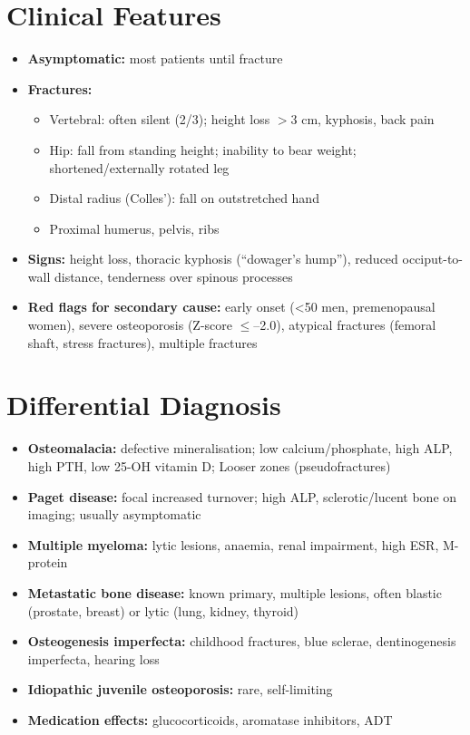 \section*{Clinical Features}
\begin{itemize}
    \item \textbf{Asymptomatic:} most patients until fracture
    \item \textbf{Fractures:}
    \begin{itemize}
        \item Vertebral: often silent (2/3); height loss $>$3 cm, kyphosis, back pain
        \item Hip: fall from standing height; inability to bear weight; shortened/externally rotated leg
        \item Distal radius (Colles'): fall on outstretched hand
        \item Proximal humerus, pelvis, ribs
    \end{itemize}
    \item \textbf{Signs:} height loss, thoracic kyphosis (``dowager's hump''), reduced occiput-to-wall distance, tenderness over spinous processes
    \item \textbf{Red flags for secondary cause:} early onset (<50 men, premenopausal women), severe osteoporosis (Z-score $\le$--2.0), atypical fractures (femoral shaft, stress fractures), multiple fractures
\end{itemize}

\section*{Differential Diagnosis}
\begin{itemize}
    \item \textbf{Osteomalacia:} defective mineralisation; low calcium/phosphate, high ALP, high PTH, low 25-OH vitamin D; Looser zones (pseudofractures)
    \item \textbf{Paget disease:} focal increased turnover; high ALP, sclerotic/lucent bone on imaging; usually asymptomatic
    \item \textbf{Multiple myeloma:} lytic lesions, anaemia, renal impairment, high ESR, M-protein
    \item \textbf{Metastatic bone disease:} known primary, multiple lesions, often blastic (prostate, breast) or lytic (lung, kidney, thyroid)
    \item \textbf{Osteogenesis imperfecta:} childhood fractures, blue sclerae, dentinogenesis imperfecta, hearing loss
    \item \textbf{Idiopathic juvenile osteoporosis:} rare, self-limiting
    \item \textbf{Medication effects:} glucocorticoids, aromatase inhibitors, ADT
\end{itemize}

